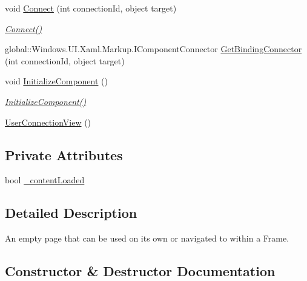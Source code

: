 \begin{DoxyCompactItemize}
void \hyperlink{class_e_l_i_client_1_1_views_1_1_user_connection_view_ae8db7e9704ee268b3c4af3046a305d85}{Connect} (int connection\+Id, object target)
\begin{DoxyCompactList}\small\item\em \hyperlink{class_e_l_i_client_1_1_views_1_1_user_connection_view_ae8db7e9704ee268b3c4af3046a305d85}{Connect()} \end{DoxyCompactList}\item 
global\+::\+Windows.\+U\+I.\+Xaml.\+Markup.\+I\+Component\+Connector \hyperlink{class_e_l_i_client_1_1_views_1_1_user_connection_view_a8586a58a3eefb9e9b58bed5d9a182de8}{Get\+Binding\+Connector} (int connection\+Id, object target)
\item 
void \hyperlink{class_e_l_i_client_1_1_views_1_1_user_connection_view_a0d727dc49392b07db75598d46de38129}{Initialize\+Component} ()
\begin{DoxyCompactList}\small\item\em \hyperlink{class_e_l_i_client_1_1_views_1_1_user_connection_view_a0d727dc49392b07db75598d46de38129}{Initialize\+Component()} \end{DoxyCompactList}\item 
\hyperlink{class_e_l_i_client_1_1_views_1_1_user_connection_view_a1c1c6101dc7a5c70bfa04e5ab73a92a9}{User\+Connection\+View} ()
\end{DoxyCompactItemize}
\subsection*{Private Attributes}
\begin{DoxyCompactItemize}
\item 
bool \hyperlink{class_e_l_i_client_1_1_views_1_1_user_connection_view_a83db8c0671745e37813e1a2e1820f6fd}{\+\_\+content\+Loaded}
\end{DoxyCompactItemize}


\subsection{Detailed Description}
An empty page that can be used on its own or navigated to within a Frame. 



\subsection{Constructor \& Destructor Documentation}
\mbox{\label{class_e_l_i_client_1_1_views_1_1_user_connection_view_a1c1c6101dc7a5c70bfa04e5ab73a92a9}} 

